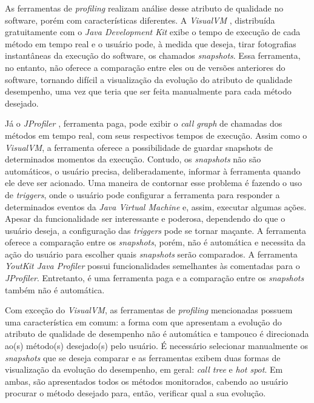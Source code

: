 As ferramentas de \textit{profiling} realizam análise desse atributo de qualidade no software, porém com características diferentes. A \textit{VisualVM} \cite{Vis}, distribuída gratuitamente com o \textit{Java Development Kit} exibe o tempo de execução de cada método em tempo real e o usuário pode, à medida que deseja, tirar fotografias instantâneas da execução do software, os chamados \textit{snapshots}. Essa ferramenta, no entanto, não oferece a comparação entre eles ou de versões anteriores do software, tornando difícil a visualização da evolução do atributo de qualidade desempenho, uma vez que teria que ser feita manualmente para cada método desejado.

Já o \textit{JProfiler} \cite{JProfiler}, ferramenta paga, pode exibir o \textit{call graph} de chamadas dos métodos em tempo real, com seus respectivos tempos de execução. Assim como o \textit{VisualVM}, a ferramenta oferece a possibilidade de guardar snapshots de determinados momentos da execução. Contudo, os \textit{snapshots} não são automáticos, o usuário precisa, deliberadamente, informar à ferramenta quando ele deve ser acionado. Uma maneira de contornar esse problema é fazendo o uso de \textit{triggers}, onde o usuário pode configurar a ferramenta para responder a determinados eventos da \textit{Java Virtual Machine}  e, assim, executar algumas ações. Apesar da funcionalidade ser interessante e poderosa, dependendo do que o usuário deseja, a configuração das \textit{triggers} pode se tornar maçante. A ferramenta oferece a comparação entre os \textit{snapshots}, porém, não é automática e necessita da ação do usuário para escolher quais \textit{snapshots} serão comparados. A ferramenta \textit{YoutKit Java Profiler} \cite{Profiler2016} possui funcionalidades semelhantes às comentadas para o \textit{JProfiler}. Entretanto, é uma ferramenta paga e a comparação entre os \textit{snapshots} também não é automática.

Com exceção do \textit{VisualVM}, as ferramentas de \textit{profiling} mencionadas possuem uma característica em comum: a forma com que apresentam a evolução do atributo de qualidade de desempenho não é automática e tampouco é direcionada ao(s) método(s) desejado(s) pelo usuário. É necessário selecionar manualmente os \textit{snapshots} que se deseja comparar e as ferramentas exibem duas formas de visualização da evolução do desempenho, em geral: \textit{call tree} e \textit{hot spot}. Em ambas, são apresentados todos os métodos monitorados, cabendo ao usuário procurar o método desejado para, então, verificar qual a sua evolução.

